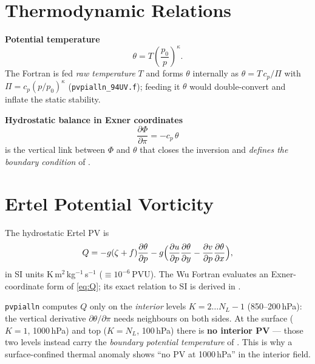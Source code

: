 \section{Thermodynamic Relations}

\textbf{Potential temperature}
\begin{equation}
\theta = T\left(\frac{p_0}{p}\right)^{\!\kappa}.
\end{equation}
The Fortran is fed \emph{raw temperature} $T$ and forms $\theta$
internally as $\theta = T\,c_p/\Pi$ with $\Pi=c_p(p/p_0)^\kappa$
(\texttt{pvpialln\_94UV.f}); feeding it $\theta$ would double-convert and
inflate the static stability.

\textbf{Hydrostatic balance in Exner coordinates}
\begin{equation}
\boxed{\;\frac{\partial\Phi}{\partial\pi}=-c_p\,\theta\;}
\label{eq:hydrostatic}
\end{equation}
is the vertical link between $\Phi$ and $\theta$ that closes the
inversion and \emph{defines the boundary condition} of
.

\section{Ertel Potential Vorticity}

The hydrostatic Ertel PV is
\begin{equation}
Q = -g(\zeta+f)\frac{\partial\theta}{\partial p}
    - g\Bigl(\frac{\partial u}{\partial p}\frac{\partial\theta}{\partial y}
            - \frac{\partial v}{\partial p}\frac{\partial\theta}{\partial x}\Bigr),
\label{eq:Q}
\end{equation}
in SI units K\,m$^2$\,kg$^{-1}$\,s$^{-1}$ ($\equiv 10^{-6}$\,PVU).  The
Wu Fortran evaluates an Exner-coordinate form of \cref{eq:Q}; its exact
relation to SI is derived in .

\begin{warnbox}
\texttt{pvpialln} computes $Q$ only on the \emph{interior} levels
$K=2\ldots N_L-1$ (850--200\,hPa): the vertical derivative
$\partial\theta/\partial\pi$ needs neighbours on both sides.  At the
surface ($K{=}1$, 1000\,hPa) and top ($K{=}N_L$, 100\,hPa) there is
\textbf{no interior PV} --- those two levels instead carry the
\emph{boundary potential temperature} of .
This is why a surface-confined thermal anomaly shows ``no PV at
1000\,hPa'' in the interior field.
\end{warnbox}

